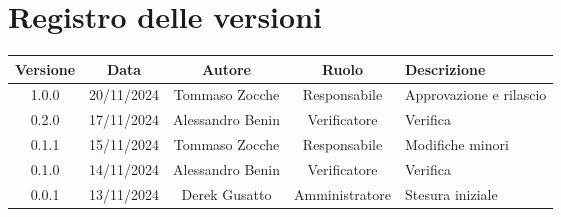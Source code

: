 
\section*{Registro delle versioni}
\begin{table}[H]
    \begin{tabular}{|c|c|c|c|p{3cm}|}
        \hline
         \textbf{Versione} &  \textbf{Data} &  \textbf{Autore} &  \textbf{Ruolo} & \textbf{Descrizione} \\
        \hline
        1.0.0 & 20/11/2024 & Tommaso Zocche & Responsabile & Approvazione e rilascio \\
        \hline
         0.2.0 & 17/11/2024 & Alessandro Benin & Verificatore & Verifica \\
        \hline
        0.1.1 & 15/11/2024 & Tommaso Zocche & Responsabile & Modifiche minori \\
        \hline
        0.1.0 & 14/11/2024 & Alessandro Benin & Verificatore & Verifica \\
        \hline
        0.0.1 & 13/11/2024 & Derek Gusatto & Amministratore  & Stesura iniziale \\
              \hline
    \end{tabular}
\end{table}
